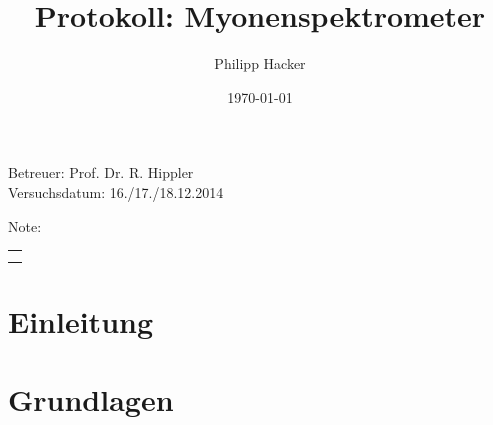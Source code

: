 \documentclass[numbers=noenddot,12pt,a4paper]{scrartcl}
\title{Protokoll: Myonenspektrometer} %
\author{Philipp Hacker} %
\date{\today}
\begin{document}
\maketitle
\begin{center}
Betreuer: Prof. Dr. R. Hippler \\ %
Versuchsdatum: 16./17./18.12.2014\\ %
\begin{table}[h]
\centering
Note: %
\begin{tabularx}{1.5cm}{|X|}
\hline \\ \\
\hline
\end{tabularx}
\end{table}
\end{center}
\vspace*{\fill}
\tableofcontents
\vfill
\newpage
\section{Einleitung}
\section{Grundlagen}
\end{document}
